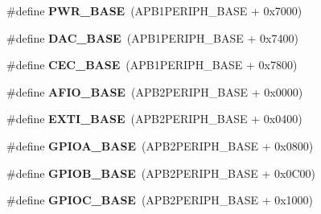 \begin{DoxyCompactItemize}
\item 
\hypertarget{group___peripheral__memory__map_gac691ec23dace8b7a649a25acb110217a}{\#define {\bfseries P\-W\-R\-\_\-\-B\-A\-S\-E}~(A\-P\-B1\-P\-E\-R\-I\-P\-H\-\_\-\-B\-A\-S\-E + 0x7000)}\label{group___peripheral__memory__map_gac691ec23dace8b7a649a25acb110217a}

\item 
\hypertarget{group___peripheral__memory__map_gad18d0b914c7f68cecbee1a2d23a67d38}{\#define {\bfseries D\-A\-C\-\_\-\-B\-A\-S\-E}~(A\-P\-B1\-P\-E\-R\-I\-P\-H\-\_\-\-B\-A\-S\-E + 0x7400)}\label{group___peripheral__memory__map_gad18d0b914c7f68cecbee1a2d23a67d38}

\item 
\hypertarget{group___peripheral__memory__map_gaacb77bc44b3f8c87ab98f241e760e440}{\#define {\bfseries C\-E\-C\-\_\-\-B\-A\-S\-E}~(A\-P\-B1\-P\-E\-R\-I\-P\-H\-\_\-\-B\-A\-S\-E + 0x7800)}\label{group___peripheral__memory__map_gaacb77bc44b3f8c87ab98f241e760e440}

\item 
\hypertarget{group___peripheral__memory__map_ga5f7e3eacfcf4c313c25012795148a680}{\#define {\bfseries A\-F\-I\-O\-\_\-\-B\-A\-S\-E}~(A\-P\-B2\-P\-E\-R\-I\-P\-H\-\_\-\-B\-A\-S\-E + 0x0000)}\label{group___peripheral__memory__map_ga5f7e3eacfcf4c313c25012795148a680}

\item 
\hypertarget{group___peripheral__memory__map_ga87371508b3bcdcd98cd1ec629be29061}{\#define {\bfseries E\-X\-T\-I\-\_\-\-B\-A\-S\-E}~(A\-P\-B2\-P\-E\-R\-I\-P\-H\-\_\-\-B\-A\-S\-E + 0x0400)}\label{group___peripheral__memory__map_ga87371508b3bcdcd98cd1ec629be29061}

\item 
\hypertarget{group___peripheral__memory__map_gad7723846cc5db8e43a44d78cf21f6efa}{\#define {\bfseries G\-P\-I\-O\-A\-\_\-\-B\-A\-S\-E}~(A\-P\-B2\-P\-E\-R\-I\-P\-H\-\_\-\-B\-A\-S\-E + 0x0800)}\label{group___peripheral__memory__map_gad7723846cc5db8e43a44d78cf21f6efa}

\item 
\hypertarget{group___peripheral__memory__map_gac944a89eb789000ece920c0f89cb6a68}{\#define {\bfseries G\-P\-I\-O\-B\-\_\-\-B\-A\-S\-E}~(A\-P\-B2\-P\-E\-R\-I\-P\-H\-\_\-\-B\-A\-S\-E + 0x0\-C00)}\label{group___peripheral__memory__map_gac944a89eb789000ece920c0f89cb6a68}

\item 
\hypertarget{group___peripheral__memory__map_ga26f267dc35338eef219544c51f1e6b3f}{\#define {\bfseries G\-P\-I\-O\-C\-\_\-\-B\-A\-S\-E}~(A\-P\-B2\-P\-E\-R\-I\-P\-H\-\_\-\-B\-A\-S\-E + 0x1000)}\label{group___peripheral__memory__map_ga26f267dc35338eef219544c51f1e6b3f}


\end{DoxyCompactItemize}
